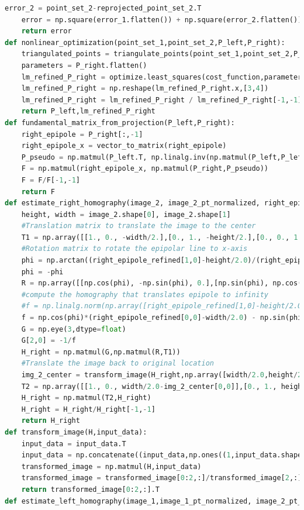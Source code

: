 \documentclass{article}
\begin{document}
\begin{lstlisting}[language=Python]
	error_2 = point_set_2-reprojected_point_set_2.T
	error = np.square(error_1.flatten()) + np.square(error_2.flatten())
	return error
def nonlinear_optimization(point_set_1,point_set_2,P_left,P_right):
	triangulated_points = triangulate_points(point_set_1,point_set_2,P_left,P_right)
	parameters = P_right.flatten()
	lm_refined_P_right = optimize.least_squares(cost_function,parameters,args=[point_set_1,point_set_2,P_left,triangulated_points],method='lm',verbose=1,ftol=1e-15)
	lm_refined_P_right = np.reshape(lm_refined_P_right.x,[3,4])
	lm_refined_P_right = lm_refined_P_right / lm_refined_P_right[-1,-1]
	return P_left,lm_refined_P_right
def fundamental_matrix_from_projection(P_left,P_right):
	right_epipole = P_right[:,-1]
	right_epipole_x = vector_to_matrix(right_epipole)
	P_pseudo = np.matmul(P_left.T, np.linalg.inv(np.matmul(P_left,P_left.T)))
	F = np.matmul(right_epipole_x, np.matmul(P_right,P_pseudo))
	F = F/F[-1,-1]
	return F
def estimate_right_homography(image_2, image_2_pt_normalized, right_epipole_refined, P_right_refined):
	height, width = image_2.shape[0], image_2.shape[1]
	#Translation matrix to translate the image to the center
	T1 = np.array([[1., 0., -width/2.],[0., 1., -height/2.],[0., 0., 1.]])
	#Rotation matrix to rotate the epipolar line to x-axis
	phi = np.arctan((right_epipole_refined[1,0]-height/2.0)/(right_epipole_refined[0,0]-width/2.0))
	phi = -phi
	R = np.array([[np.cos(phi), -np.sin(phi), 0.],[np.sin(phi), np.cos(phi), 0.],[0.,0.,1.]])
	#compute the homography that translates epipole to infinity
	#f = np.linalg.norm(np.array([right_epipole_refined[1,0]-height/2.0, right_epipole_refined[0,0]-width/2.0]))
	f = np.cos(phi)*(right_epipole_refined[0,0]-width/2.0) - np.sin(phi)*(right_epipole_refined[1,0]-height/2.0)
	G = np.eye(3,dtype=float)
	G[2,0] = -1/f
	H_right = np.matmul(G,np.matmul(R,T1))
	#Translate the image back to original location
	img_2_center = transform_image(H_right,np.array([width/2.0,height/2.0]).reshape([1,2]))
	T2 = np.array([[1., 0., width/2.0-img_2_center[0,0]],[0., 1., height/2.0-img_2_center[0,1]],[0., 0., 1.]])
	H_right = np.matmul(T2,H_right)
	H_right = H_right/H_right[-1,-1]
	return H_right
def transform_image(H,input_data):
	input_data = input_data.T
	input_data = np.concatenate((input_data,np.ones((1,input_data.shape[1]))),axis=0)
	transformed_image = np.matmul(H,input_data)
	transformed_image = transformed_image[0:2,:]/transformed_image[2,:]
	return transformed_image[0:2,:].T
def estimate_left_homography(image_1,image_1_pt_normalized, image_2_pt_normalized, left_epipole_refined, P_left_refined, P_right_refined, H_right):

\end{lstlisting}
\end{document}
